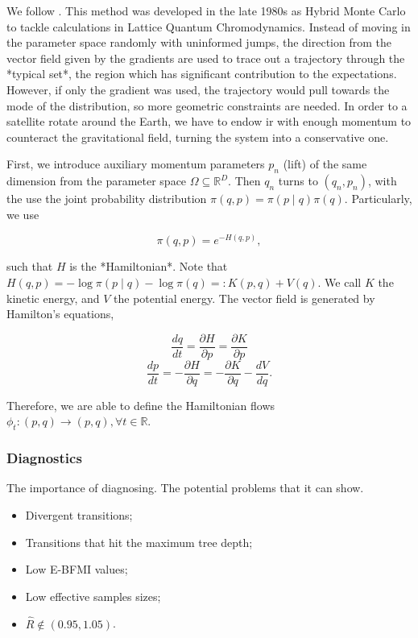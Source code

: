We follow \cite{betancourt2017conceptual}. This method was developed in the late 1980s as Hybrid Monte Carlo to tackle calculations in Lattice Quantum Chromodynamics. Instead of moving in the parameter space randomly with uninformed jumps, the direction from the vector field given by the gradients are used to trace out a trajectory through the *typical set*, the region which has significant contribution to the expectations. However, if only the gradient was used, the trajectory would pull towards the mode of the distribution, so more geometric constraints are needed. In order to a satellite rotate around the Earth, we have to endow ir with enough momentum to counteract the gravitational field, turning the system into a conservative one. 

First, we introduce auxiliary momentum parameters $p_n$ (lift) of the same dimension from the parameter space $\Omega \subseteq \mathbb{R}^D$. Then $q_n$ turns to $(q_n, p_n)$, with the use the joint probability distribution $\pi(q,p) = \pi(p\mid q)\pi(q)$. Particularly, we use 

$$
\pi(q,p) = e^{-H(q,p)}, 
$$

such that $H$ is the *Hamiltonian*. Note that $H(q,p) = -\log \pi(p\mid q) - \log \pi(q) =: K(p,q) + V(q)$. We call $K$ the kinetic energy, and $V$ the potential energy. The vector field is generated by Hamilton's equations, 

$$
\frac{dq}{dt} = \frac{\partial H}{\partial p} = \frac{\partial K}{\partial p}
$$
$$
\frac{dp}{dt} = -\frac{\partial H}{\partial q} = -\frac{\partial K}{\partial q} - \frac{d V}{d q}.
$$

Therefore, we are able to define the Hamiltonian flows $\phi_t : (p,q) \to
(p,q), \forall t \in \mathbb{R}$.

\subsubsection{Diagnostics}

The importance of diagnosing. The potential problems that it can show. 

\begin{itemize}
  \item Divergent transitions; 
  \item Transitions that hit the maximum tree depth; 
  \item Low E-BFMI values; 
  \item Low effective samples sizes; 
  \item $\hat{R} \not \in (0.95, 1.05)$.   
\end{itemize}